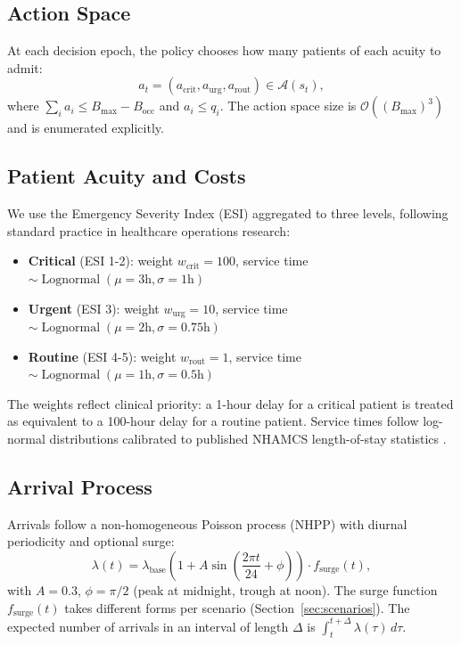 \documentclass[11pt,twocolumn]{article}
\theoremstyle{plain}
\theoremstyle{definition}
\begin{document}
\subsection{Action Space}

At each decision epoch, the policy chooses how many patients of each acuity to admit:
\begin{equation}
a_t = (a_{\text{crit}}, a_{\text{urg}}, a_{\text{rout}}) \in \mathcal{A}(s_t),
\end{equation}
where $\sum_i a_i \le B_{\max} - B_{\text{occ}}$ and $a_i \le q_i$. The action space size is $\mathcal{O}((B_{\max})^3)$ and is enumerated explicitly.

\subsection{Patient Acuity and Costs}

We use the Emergency Severity Index (ESI) aggregated to three levels, following standard practice in healthcare operations research:
\begin{itemize}
\item \textbf{Critical} (ESI 1-2): weight $w_{\text{crit}} = 100$, service time $\sim \operatorname{Lognormal}(\mu=3\text{h}, \sigma=1\text{h})$
\item \textbf{Urgent} (ESI 3): weight $w_{\text{urg}} = 10$, service time $\sim \operatorname{Lognormal}(\mu=2\text{h}, \sigma=0.75\text{h})$
\item \textbf{Routine} (ESI 4-5): weight $w_{\text{rout}} = 1$, service time $\sim \operatorname{Lognormal}(\mu=1\text{h}, \sigma=0.5\text{h})$
\end{itemize}

The weights reflect clinical priority: a 1-hour delay for a critical patient is treated as equivalent to a 100-hour delay for a routine patient. Service times follow log-normal distributions calibrated to published NHAMCS length-of-stay statistics \cite{johnson2023mimic}.

\subsection{Arrival Process}

Arrivals follow a non-homogeneous Poisson process (NHPP) with diurnal periodicity and optional surge:
\begin{equation}
\lambda(t) = \lambda_{\text{base}} \left(1 + A \sin\left(\frac{2\pi t}{24} + \phi\right)\right) \cdot f_{\text{surge}}(t),
\label{eq:nhpp}
\end{equation}
with $A = 0.3$, $\phi = \pi/2$ (peak at midnight, trough at noon). The surge function $f_{\text{surge}}(t)$ takes different forms per scenario (Section~\ref{sec:scenarios}). The expected number of arrivals in an interval of length $\Delta$ is $\int_t^{t+\Delta} \lambda(\tau)\,d\tau$.
\end{document}
